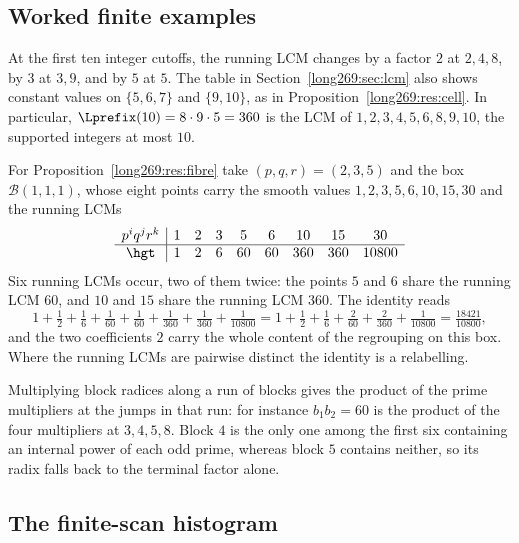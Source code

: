 \subsection{Worked finite examples}\label{long269:long:finite-geometry}

At the first ten integer cutoffs, the running LCM changes by a factor $2$
at $2,4,8$, by $3$ at $3,9$, and by $5$ at $5$.
The table in Section~\ref{long269:sec:lcm} also shows constant values on
$\{5,6,7\}$ and $\{9,10\}$, as in
Proposition~\ref{long269:res:cell}. In particular,
$\Lprefix(10)=8\cdot9\cdot5=360$ is the LCM of
$1,2,3,4,5,6,8,9,10$, the supported integers at most $10$.

For Proposition~\ref{long269:res:fibre} take $(p,q,r)=(2,3,5)$ and the box
$\mathcal B(1,1,1)$, whose eight points carry the smooth values
$1,2,3,5,6,10,15,30$ and the running LCMs
\[
\begin{array}{c|cccccccc}
p^{i}q^{j}r^{k}&1&2&3&5&6&10&15&30\\ \hline
\hgt&1&2&6&60&60&360&360&10800
\end{array}
\]
Six running LCMs occur, two of them twice: the points $5$ and $6$ share the running LCM
$60$, and $10$ and $15$ share the running LCM $360$.  The identity reads
\[
 1+\tfrac12+\tfrac16+\tfrac1{60}+\tfrac1{60}+\tfrac1{360}+\tfrac1{360}
 +\tfrac1{10800}
 =1+\tfrac12+\tfrac16+\tfrac2{60}+\tfrac2{360}+\tfrac1{10800}
 =\tfrac{18421}{10800},
\]
and the two coefficients $2$ carry the whole content of the regrouping on this
box.  Where the running LCMs are pairwise distinct the identity is a relabelling.

Multiplying block radices along a run of blocks gives the product of the
prime multipliers at the jumps in that run: for instance $b_1b_2=60$ is the product of the
four multipliers at $3,4,5,8$.  Block $4$ is the only one among the first six
containing an internal power of each odd prime, whereas block $5$ contains neither, so
its radix falls back to the terminal factor alone.

\subsection{The finite-scan histogram}\label{long269:long:experiments}

